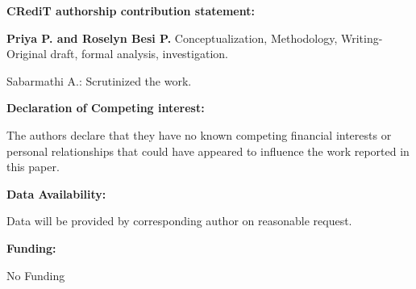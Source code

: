 \documentclass[10pt]{NSP1}
\begin{document}
\textbf{CRediT authorship contribution statement:}

\textbf{Priya P. and Roselyn Besi P.} Conceptualization, Methodology, Writing-Original draft, formal analysis, investigation.

Sabarmathi A.: Scrutinized the work.

\textbf{Declaration of Competing interest:}

The authors declare that they have no known competing financial interests or personal relationships that could have appeared to influence the work reported in this paper.

\textbf{Data Availability:}

Data will be provided by corresponding author on reasonable request.

\textbf{Funding:}

No Funding
\end{document}
